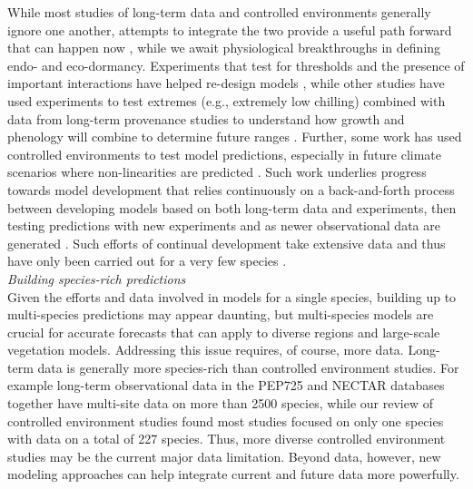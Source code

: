 \documentclass[11pt,letter]{article}
\begin{document}
While most studies of long-term data and controlled environments generally ignore one another, attempts to integrate the two provide a useful path forward that can happen now \citep{Caffarra:2011qf,nagano2012,satake2013,ford2016,chuinearees}, while we await physiological breakthroughs in defining endo- and eco-dormancy. Experiments that test for thresholds and the presence of important interactions have helped re-design models \citep{Caffarra:2011qf,chuinearees}, while other studies have used experiments to test extremes (e.g., extremely low chilling) combined with data from long-term provenance studies to understand how growth and phenology will combine to determine future ranges \citep{ford2016}. Further, some work has used controlled environments to test model predictions, especially in future climate scenarios where non-linearities are predicted \citep[see][]{nagano2012}. Such work underlies progress towards model development that relies continuously on a back-and-forth process between developing models based on both long-term data and experiments, then testing predictions with new experiments and as newer observational data are generated \citep[i.e., more years and also data from new locations,][]{nagano2012,satake2013}. Such efforts of continual development take extensive data and thus have only been carried out for a very few species \citep[e.g., \emph{Arabidopsis thaliana}, \emph{Oryza sativa} (rice), \emph{Arabidopsis halleri},][]{Wilczek:2009oa,nagano2012,satake2013}.\\

\emph{Building species-rich predictions}\\
Given the efforts and data involved in models for a single species, building up to multi-species predictions may appear daunting, but multi-species models are crucial for accurate forecasts that can apply to diverse regions and large-scale vegetation models. Addressing this issue requires, of course, more data. Long-term data is generally more species-rich than controlled environment studies. For example long-term observational data in the PEP725 and NECTAR databases together have multi-site data on more than 2500 species, while our review of controlled environment studies found most studies focused on only one species with data on a total of 227 species. Thus, more diverse controlled environment studies may be the current major data limitation. Beyond data, however, new modeling approaches can help integrate current and future data more powerfully. \\
\end{document}
